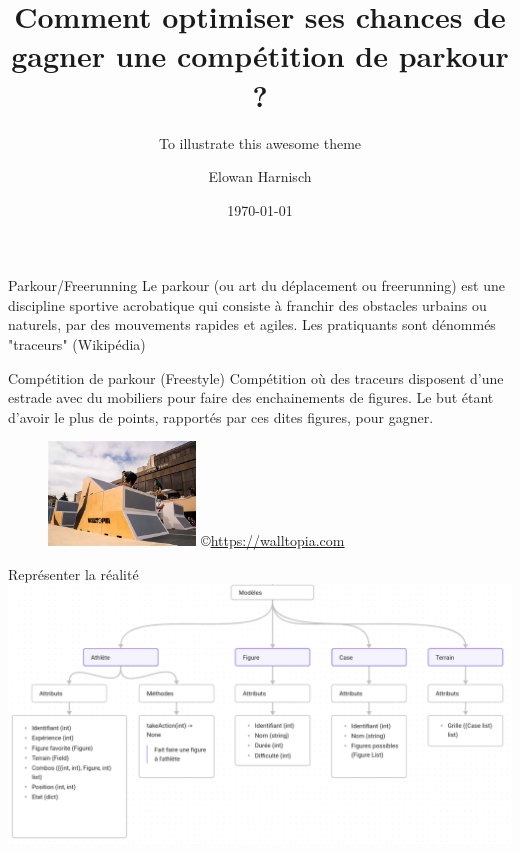 \documentclass[aspectratio=43, usepdftitle=false, xcolor={dvipsnames}]{beamer}
\title{Comment optimiser ses chances de gagner une compétition de parkour ?}
\author[Elowan]{Elowan Harnisch}
\subtitle{To illustrate this awesome theme}
\institute{Institute of Software Engineering and\\Programming Languages}
\date{\today}
\begin{document}
\maketitle

\begin{frame}
	\begin{block}{Parkour/Freerunning}
	Le parkour (ou art du déplacement ou freerunning) est une discipline sportive acrobatique qui consiste à franchir des obstacles urbains ou naturels, par des mouvements rapides et agiles. Les pratiquants sont dénommés "traceurs" (Wikipédia)
	\end{block}

	\begin{block}{Compétition de parkour (Freestyle)}
	Compétition où des traceurs disposent d'une estrade avec du mobiliers pour faire des enchainements de figures. Le but étant d'avoir le plus de points, rapportés par ces dites figures, pour gagner.
	\end{block}

	\begin{figure}
		\center
		\includegraphics[width=0.35\textwidth]{images/terrain.png}
		©\url{https://walltopia.com}
	\end{figure}
\end{frame}


\begin{frame}{Représenter la réalité}
	\includegraphics[width=1\textwidth]{images/modeles.png}
\end{frame}
\end{document}
